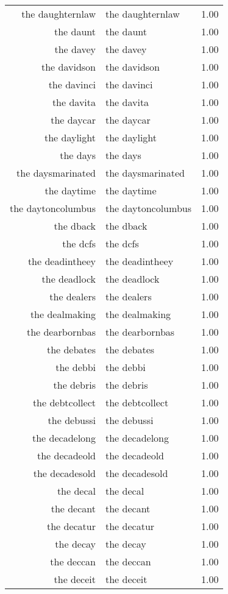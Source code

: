 \begin{table}[ht]
\begin{tabular}{rlr}
  the daughternlaw & the daughternlaw & 1.00 \\ 
  the daunt & the daunt & 1.00 \\ 
  the davey & the davey & 1.00 \\ 
  the davidson & the davidson & 1.00 \\ 
  the davinci & the davinci & 1.00 \\ 
  the davita & the davita & 1.00 \\ 
  the daycar & the daycar & 1.00 \\ 
  the daylight & the daylight & 1.00 \\ 
  the days & the days & 1.00 \\ 
  the daysmarinated & the daysmarinated & 1.00 \\ 
  the daytime & the daytime & 1.00 \\ 
  the daytoncolumbus & the daytoncolumbus & 1.00 \\ 
  the dback & the dback & 1.00 \\ 
  the dcfs & the dcfs & 1.00 \\ 
  the deadintheey & the deadintheey & 1.00 \\ 
  the deadlock & the deadlock & 1.00 \\ 
  the dealers & the dealers & 1.00 \\ 
  the dealmaking & the dealmaking & 1.00 \\ 
  the dearbornbas & the dearbornbas & 1.00 \\ 
  the debates & the debates & 1.00 \\ 
  the debbi & the debbi & 1.00 \\ 
  the debris & the debris & 1.00 \\ 
  the debtcollect & the debtcollect & 1.00 \\ 
  the debussi & the debussi & 1.00 \\ 
  the decadelong & the decadelong & 1.00 \\ 
  the decadeold & the decadeold & 1.00 \\ 
  the decadesold & the decadesold & 1.00 \\ 
  the decal & the decal & 1.00 \\ 
  the decant & the decant & 1.00 \\ 
  the decatur & the decatur & 1.00 \\ 
  the decay & the decay & 1.00 \\ 
  the deccan & the deccan & 1.00 \\ 
  the deceit & the deceit & 1.00 \\ 

\end{tabular}
\end{table}
